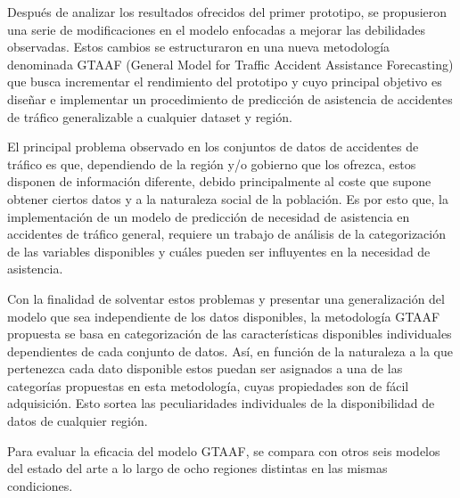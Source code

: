 

Después de analizar los resultados ofrecidos del primer prototipo, se propusieron una serie de modificaciones en el modelo enfocadas a mejorar las debilidades observadas. Estos cambios se estructuraron en una nueva metodología denominada GTAAF (General Model for Traffic Accident Assistance Forecasting) que busca incrementar el rendimiento del prototipo y cuyo principal objetivo es diseñar e implementar un procedimiento de predicción de asistencia de accidentes de tráfico generalizable a cualquier dataset y región. 

El principal problema observado en los conjuntos de datos de accidentes de tráfico es que, dependiendo de la región y/o gobierno que los ofrezca, estos disponen de información diferente, debido principalmente al coste que supone obtener ciertos datos y a la naturaleza social de la población. Es por esto que, la implementación de un modelo de predicción de necesidad de asistencia en accidentes de tráfico general, requiere un trabajo de análisis de la categorización de las variables disponibles y cuáles pueden ser influyentes en la necesidad de asistencia.

Con la finalidad de solventar estos problemas y presentar una generalización del modelo que sea independiente de los datos disponibles, la metodología GTAAF propuesta se basa en categorización de las características disponibles individuales dependientes de cada conjunto de datos. Así, en función de la naturaleza a la que pertenezca cada dato disponible estos puedan ser asignados a una de las categorías propuestas en esta metodología, cuyas propiedades son de fácil adquisición. Esto sortea las peculiaridades individuales de la disponibilidad de datos de cualquier región. 

Para evaluar la eficacia del modelo GTAAF, se compara con otros seis modelos del estado del arte a lo largo de ocho regiones distintas en las mismas condiciones.


